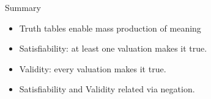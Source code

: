 \documentclass[xetex,aspectratio=169,14pt,hyperref={pdfpagelabels=true,pdflang={en-GB}}]{beamer}
\begin{document}


\begin{frame}
  {Summary}

  \begin{itemize}
  \item Truth tables enable mass production of meaning
  \item Satisfiability: at least one valuation makes it true.
  \item Validity: every valuation makes it true.
  \item Satisfiability and Validity related via negation.
  \end{itemize}
\end{frame}
\end{document}
